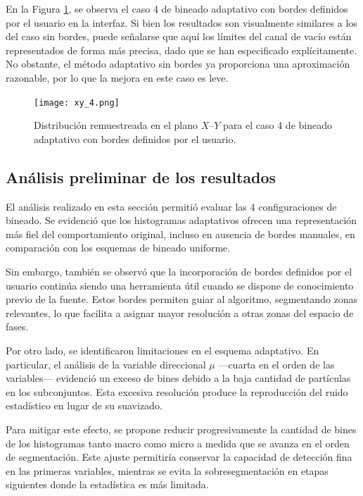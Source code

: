 En la Figura \ref{fig:xy_4}, se observa el caso 4 de bineado adaptativo con bordes definidos por el usuario en la interfaz. Si bien los resultados son visualmente similares a los del caso sin bordes, puede señalarse que aquí los límites del canal de vacío están representados de forma más precisa, dado que se han especificado explícitamente. No obstante, el método adaptativo sin bordes ya proporciona una aproximación razonable, por lo que la mejora en este caso es leve.

\begin{figure}[H]
    \centering
    \texttt{[image: xy\_4.png]}
    \caption{Distribución remuestreada en el plano $X$–$Y$ para el caso 4 de bineado adaptativo con bordes definidos por el usuario.}
    \label{fig:xy_4}
\end{figure}

\subsection{Análisis preliminar de los resultados}

El análisis realizado en esta sección permitió evaluar las 4 configuraciones de bineado. Se evidenció que los histogramas adaptativos ofrecen una representación más fiel del comportamiento original, incluso en ausencia de bordes manuales, en comparación con los esquemas de bineado uniforme.

Sin embargo, también se observó que la incorporación de bordes definidos por el usuario continúa siendo una herramienta útil cuando se dispone de conocimiento previo de la fuente. Estos bordes permiten guiar al algoritmo, segmentando zonas relevantes, lo que facilita a asignar mayor resolución a otras zonas del espacio de fases.

Por otro lado, se identificaron limitaciones en el esquema adaptativo. En particular, el análisis de la variable direccional $\mu$ —cuarta en el orden de las variables— evidenció un exceso de bines debido a la baja cantidad de partículas en los subconjuntos. Esta excesiva resolución produce la reproducción del ruido estadístico en lugar de su suavizado.

Para mitigar este efecto, se propone reducir progresivamente la cantidad de bines de los histogramas tanto macro como micro a medida que se avanza en el orden de segmentación. Este ajuste permitiría conservar la capacidad de detección fina en las primeras variables, mientras se evita la sobresegmentación en etapas siguientes donde la estadística es más limitada.

